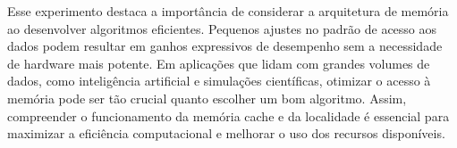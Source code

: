 \documentclass[a4paper, 12pt]{article}
\begin{document}
	
	Esse experimento destaca a importância de considerar a arquitetura de memória ao desenvolver algoritmos eficientes. Pequenos ajustes no padrão de acesso aos dados podem resultar em ganhos expressivos de desempenho sem a necessidade de hardware mais potente. Em aplicações que lidam com grandes volumes de dados, como inteligência artificial e simulações científicas, otimizar o acesso à memória pode ser tão crucial quanto escolher um bom algoritmo. Assim, compreender o funcionamento da memória cache e da localidade é essencial para maximizar a eficiência computacional e melhorar o uso dos recursos disponíveis.


	
	
\end{document}
